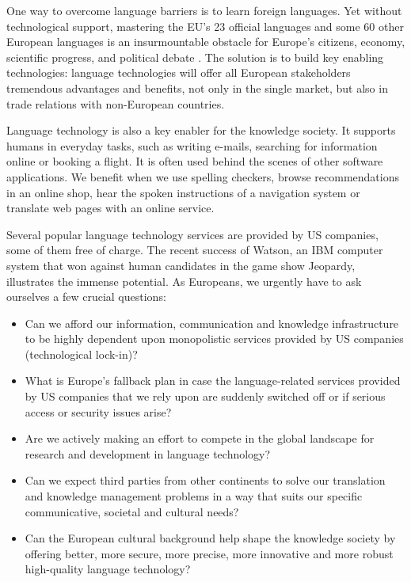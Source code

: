 \documentclass[10pt, plain]{../../metanetpaper}
\begin{document}
\begin{multicols}{2}
One way to overcome language barriers is to learn foreign languages. Yet without technological support, mastering the EU's 23 official languages and some 60 other European languages is an insurmountable obstacle for Europe’s citizens, economy, scientific progress, and political debate \cite{ombudsman2012}. The solution is to build key enabling technologies: language technologies will offer all European stakeholders tremendous advantages and benefits, not only in the single market, but also in trade relations with non-European countries.

Language technology is also a key enabler for the knowledge society. It supports humans in everyday tasks, such as writing e-mails, searching for information online or booking a flight. It is often used behind the scenes of other software applications. We benefit when we use spelling checkers, browse recommendations in an online shop, hear the spoken instructions of a navigation system or translate web pages with an online service.

Several popular language technology services are provided by US companies, some of them free of charge. The recent success of Watson, an IBM computer system that won against human candidates in the game show Jeopardy, illustrates the immense potential. As Europeans, we urgently have to ask ourselves a few crucial questions:

\begin{itemize}
\item Can we afford our information, communication and knowledge infrastructure to be highly dependent upon monopolistic services provided by US companies (technological lock-in)?
\item What is Europe's fallback plan in case the language-related services provided by US companies that we rely upon are suddenly switched off or if serious access or security issues arise?
\item Are we actively making an effort to compete in the global landscape for research and development in language technology?
\item Can we expect third parties from other continents to solve our translation and knowledge management problems in a way that suits our specific communicative, societal and cultural needs?
\item Can the European cultural background help shape the knowledge society by offering better, more secure, more precise, more innovative and more robust high-quality language technology?
\end{itemize}


\end{multicols}
\end{document}
